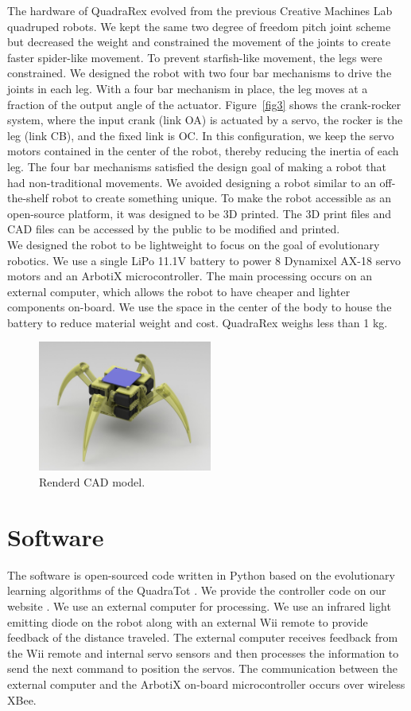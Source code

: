 \documentclass[letterpaper]{article}
\begin{document}
The hardware of QuadraRex evolved from the previous Creative Machines Lab quadruped robots. We kept the same two degree of freedom pitch joint scheme but decreased the weight and constrained the movement of the joints to create faster spider-like movement. To prevent starfish-like movement, the legs were constrained. We designed the robot with two four bar mechanisms to drive the joints in each leg. With a four bar mechanism in place, the leg moves at a fraction of the output angle of the actuator. Figure~\ref{fig3} shows the crank-rocker system, where the input crank (link OA) is actuated by a servo, the rocker is the leg (link CB), and the fixed link is OC. In this configuration, we keep the servo motors contained in the center of the robot, thereby reducing the inertia of each leg. The four bar mechanisms satisfied the design goal of making a robot that had non-traditional movements. We avoided designing a robot similar to an off-the-shelf robot to create something unique. To make the robot accessible as an open-source platform, it was designed to be 3D printed. The 3D print files and CAD files can be accessed by the public to be modified and printed.
\\
We designed the robot to be lightweight to focus on the goal of evolutionary robotics. We use a single LiPo 11.1V battery to power 8 Dynamixel AX-18 servo motors and an ArbotiX microcontroller. The main processing occurs on an external computer, which allows the robot to have cheaper and lighter components on-board. We use the space in the center of the body to house the battery to reduce material weight and cost. QuadraRex weighs less than 1 kg.
\begin{figure}[t]
\begin{center}
\includegraphics[width=2.25in,angle=0]{fig5.jpg}
\caption{Renderd CAD model.}
\label{fi52}
\end{center}
\end{figure}

\section{Software}
The software is open-sourced code written in Python based on the evolutionary learning algorithms of the QuadraTot \citep{JY}. We provide the controller code on our website \citep{WEB}. We use an external computer for processing. We use an infrared light emitting diode on the robot along with an external Wii remote to provide feedback of the distance traveled. The external computer receives feedback from the Wii remote and internal servo sensors and then processes the information to send the next command to position the servos. The communication between the external computer and the ArbotiX on-board microcontroller occurs over wireless XBee.
\end{document}
